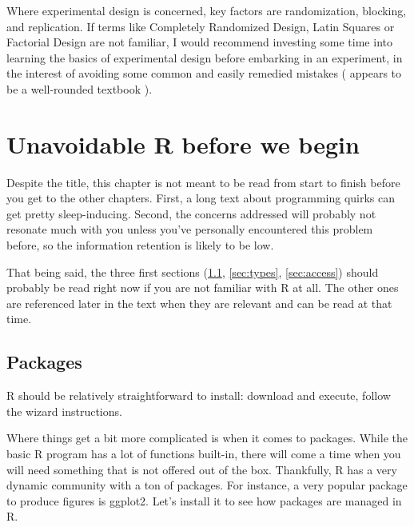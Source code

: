 \documentclass{report}
\newcommand{\code}[1]{\textsf{\ttfamily #1}}
\begin{document}
		Where experimental design is concerned, key factors are randomization, blocking, and replication. If terms like Completely Randomized Design, Latin Squares or Factorial Design are not familiar, I would recommend investing some time into learning the basics of experimental design before embarking in an experiment, in the interest of avoiding some common and easily remedied mistakes (\cite{doe} appears to be a well-rounded textbook ).

\chapter{Unavoidable R before we begin}
	Despite the title, this chapter is not meant to be read from start to finish before you get to the other chapters. First, a long text about programming quirks can get pretty sleep-inducing. Second, the concerns addressed will probably not resonate much with you unless you've personally encountered this problem before, so the information retention is likely to be low.
	
	That being said, the three first sections (\ref{sec:packages}, \ref{sec:types}, \ref{sec:access}) should probably be read right now if you are not familiar with R at all. The other ones are referenced later in the text when they are relevant and can be read at that time.

	\section{Packages}\label{sec:packages}
	R \cite{R} should be relatively straightforward to install: download and execute, follow the wizard instructions.

	Where things get a bit more complicated is when it comes to packages. While the basic R program has a lot of functions built-in, there will come a time when you will need something that is not offered out of the box. Thankfully, R has a very dynamic community with a ton of packages. For instance, a very popular package to produce figures is \code{ggplot2}. Let's install it to see how packages are managed in R.
\end{document}
